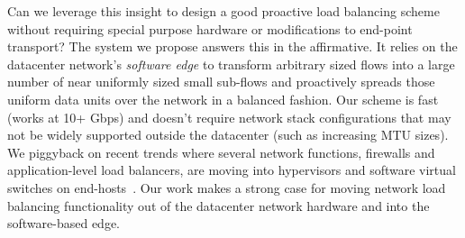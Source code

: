 Can we leverage this insight to design a good proactive load balancing scheme without requiring special purpose hardware or modifications to end-point transport? The system we propose answers this in the affirmative. It relies on the datacenter network's {\em software edge} to transform arbitrary sized flows into a large number of near uniformly sized small sub-flows and proactively spreads those uniform data units over the network in a balanced fashion. Our scheme is fast (works at 10+ Gbps) and doesn't require network stack configurations that may not be widely supported outside the datacenter (such as increasing MTU sizes). We piggyback on recent trends where several network functions, \eg{}firewalls and application-level load balancers, are moving into hypervisors and software virtual switches on end-hosts~\cite{nv-mtd,ovs-extending,eden}. Our work makes a strong case for moving network load balancing functionality out of the datacenter network hardware and into the software-based edge.


\iffalse
Fortunately, many commonly deployed network topologies like 2-tier folded Clos (leaf-spine) already meet the network symmetry 
requirements though asymmetry may occur due to failures and should be handled. The main challenge then is to achieve uniformity 
in flow sizes i.e. a mechanism that can efficiently multiplex and de-multiplex logical flows into a more uniformly sized smaller 
sub-flow units. This mapping and the load balancing of the resulting units should ideally be done 
in the network itself instead of transport layer.
\fi


